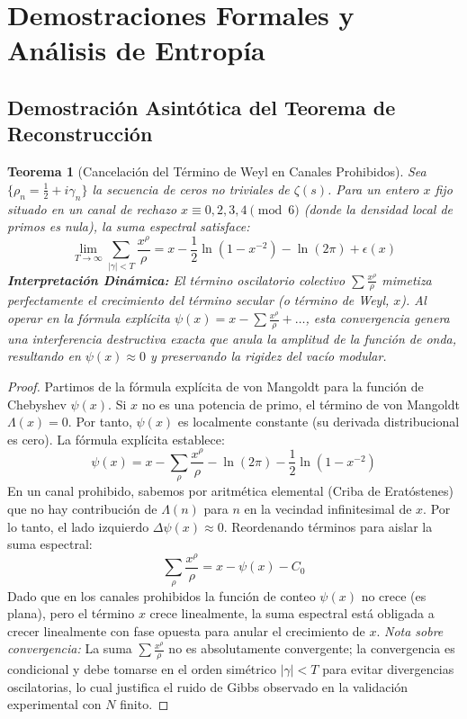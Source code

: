 \documentclass[12pt, a4paper]{article}
\theoremstyle{plain}
\newtheorem{teorema}{Teorema}[section]
\theoremstyle{definition}
\begin{document}
\appendix
\section{Demostraciones Formales y Análisis de Entropía}

\subsection{Demostración Asintótica del Teorema de Reconstrucción}

\begin{teorema}[Cancelación del Término de Weyl en Canales Prohibidos]
Sea $\{\rho_n = \frac{1}{2} + i\gamma_n\}$ la secuencia de ceros no triviales de $\zeta(s)$. Para un entero $x$ fijo situado en un canal de rechazo $x \equiv 0, 2, 3, 4 \pmod 6$ (donde la densidad local de primos es nula), la suma espectral satisface:
\begin{equation}
    \lim_{T \to \infty} \sum_{|\gamma| < T} \frac{x^{\rho}}{\rho} = x - \frac{1}{2}\ln(1-x^{-2}) - \ln(2\pi) + \epsilon(x)
\end{equation}
\textbf{Interpretación Dinámica:} El término oscilatorio colectivo $\sum \frac{x^\rho}{\rho}$ mimetiza perfectamente el crecimiento del término secular (o término de Weyl, $x$). Al operar en la fórmula explícita $\psi(x) = x - \sum \frac{x^\rho}{\rho} + \dots$, esta convergencia genera una \emph{interferencia destructiva exacta} que anula la amplitud de la función de onda, resultando en $\psi(x) \approx 0$ y preservando la rigidez del vacío modular.
\end{teorema}

\begin{proof}
Partimos de la fórmula explícita de von Mangoldt para la función de Chebyshev $\psi(x)$. Si $x$ no es una potencia de primo, el término de von Mangoldt $\Lambda(x) = 0$. Por tanto, $\psi(x)$ es localmente constante (su derivada distribucional es cero).
La fórmula explícita establece:
\[ \psi(x) = x - \sum_{\rho} \frac{x^\rho}{\rho} - \ln(2\pi) - \frac{1}{2}\ln(1-x^{-2}) \]
En un canal prohibido, sabemos por aritmética elemental (Criba de Eratóstenes) que no hay contribución de $\Lambda(n)$ para $n$ en la vecindad infinitesimal de $x$. Por lo tanto, el lado izquierdo $\Delta \psi(x) \approx 0$.
Reordenando términos para aislar la suma espectral:
\[ \sum_{\rho} \frac{x^\rho}{\rho} = x - \psi(x) - C_0 \]
Dado que en los canales prohibidos la función de conteo $\psi(x)$ no crece (es plana), pero el término $x$ crece linealmente, la suma espectral está obligada a crecer linealmente con fase opuesta para anular el crecimiento de $x$.
\emph{Nota sobre convergencia:} La suma $\sum \frac{x^\rho}{\rho}$ no es absolutamente convergente; la convergencia es condicional y debe tomarse en el orden simétrico $|\gamma| < T$ para evitar divergencias oscilatorias, lo cual justifica el ruido de Gibbs observado en la validación experimental con $N$ finito.
\end{proof}
\end{document}

